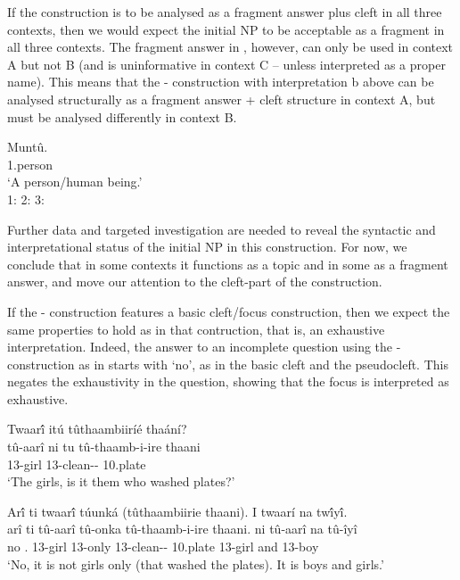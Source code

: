 \documentclass[output=paper]{langscibook}
\begin{document}
If the construction is to be analysed as a fragment answer plus cleft in all three contexts, then we would expect the initial NP to be acceptable as a fragment in all three contexts. The fragment answer in , however, can only be used in context A but not B (and is uninformative in context C – unless interpreted as a proper name). This means that the \NI-\PRO{} construction with interpretation b above can be analysed structurally as a fragment answer + cleft structure in context A, but must be analysed differently in context B.

\ea
\label{bkm:Ref111824017}
\gll
Muntû.\\
1.person\\
\glt
‘A person/human being.’\\
1:  \cmark{} 2: \xmark{} 3: \xmark{}

\z

Further data and targeted investigation are needed to reveal the syntactic and interpretational status of the initial NP in this construction. For now, we conclude that in some contexts it functions as a topic and in some as a fragment answer, and move our attention to the cleft-part of the construction.

If the \NI-\PRO{} construction features a basic cleft/focus construction, then we expect the same properties to hold as in that contruction, that is, an exhaustive interpretation. Indeed, the answer to an incomplete question using the \NI-\PRO{} construction as in  starts with ‘no’, as in the basic cleft and the pseudocleft. This negates the exhaustivity in the question, showing that the focus is interpreted as exhaustive.

\ea
\label{bkm:Ref111986751}
\begin{xlist}
Twaar\'{î} itú tûthaambiiríé thaání?\\
\gll
tû-aarî  ni  tu  tû-thaamb-i-ire  thaani\\
13-girl \FOC{}  \PRO{}  13\SM{}-clean-\IC{}-\PFV{} 10.plate\\
\glt
‘The girls, is it them who washed plates?’

Ar\'{î} ti twaar\'{î} túunká (tûthaambiirie thaani). I twaarí na tw\'{î}y\'{î}.\\
\gll
arî  ti  tû-aarî  tû-onka  tû-thaamb-i-ire  thaani.  ni  tû-aarî  na  tû-îyî\\
no \NEG.\COP{} 13-girl  13-only 13\SM{}-clean-\IC{}-\PFV{} 10.plate \FOC{} 13-girl  and  13-boy\\
\glt
‘No, it is not girls only (that washed the plates). It is boys and girls.’

\end{xlist}
\z
\end{document}

